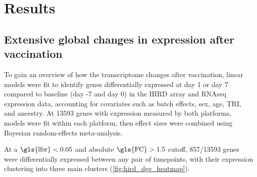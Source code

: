 \section{Results}

\subsection{Extensive global changes in expression after vaccination}

To gain an overview of how the transcriptome changes after vaccination, linear models were fit to identify genes differentially expressed at day 1 or day 7 compared to baseline (day -7 and day 0) in the \gls{HIRD} array and \gls{RNAseq} expression data, accounting for covariates such as batch effects, sex, age, \gls{TRI}, and ancestry.
At 13593 genes with expression measured by both platforms, models were fit within each platform, then effect sizes were combined using Bayesian random-effects meta-analysis.

At a $\text{\gls{lfsr}} < 0.05$ and absolute $\text{\gls{FC}} > 1.5$ cutoff, 857/13593 genes were differentially expressed between any pair of timepoints, with their expression clustering into three main clusters (\autoref{fig:hird_dge_heatmap}).
 
